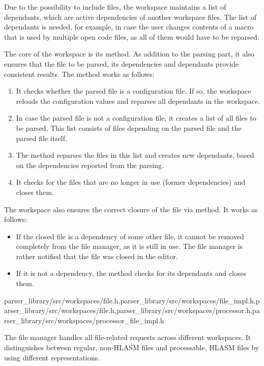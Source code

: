 Due to the possibility to include files, the workspace maintains a list of dependants, which are  active dependencies of another workspace files. The list of dependants is needed, for example, in case the user changes contents of a macro that is used by multiple open code files, as all of them would have to be reparsed.

The core of the workspace is its  method. As addition to the parsing part, it also ensures that the file to be parsed, its dependencies and dependants provide consistent results. The method works as follows:

\begin{enumerate}
	\item It checks whether the parsed file is a configuration file. If so, the workspace reloads the configuration values and reparses all dependants in the workspace.
	\item In case the parsed file is not a configuration file, it creates a list of all files to be parsed. This list consists of files depending on the parsed file and the parsed file itself.
	\item The method reparses the files in this list and creates new dependants, based on the dependencies reported from the parsing.
	\item It checks for the files that are no longer in use (former dependencies) and closes them.
\end{enumerate}

The workspace also ensures the correct closure of the file via  method. It works as follows:

\begin{itemize}
	\item If the closed file is a dependency of some other file, it cannot be removed completely from the file manager, as it is still in use. The file manager is rather notified that the file was closed in the editor.
	\item If it is not a dependency, the method checks for its dependants and closes them. 
\end{itemize}                        

{parser\_library/src/workspaces/file.h,parser\_library/src/workspaces/file\_impl.h,parser\_library/src/workspaces/file.h,parser\_library/src/workspaces/processor.h,parser\_library/src/workspaces/processor\_file\_impl.h}

The file manager handles all file-related requests across different workspaces. It distinguishes between regular, non-HLASM files and processable, HLASM files by using different representations.

